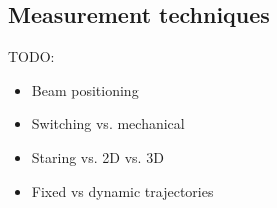 \subsection{Measurement techniques}
\label{sec:intro_meas_tech}

TODO:
\begin{itemize}
\color{red}
    \item Beam positioning
    \item Switching vs. mechanical
    \item Staring vs. 2D vs. 3D
    \item Fixed vs dynamic trajectories
\end{itemize}




\clearpage